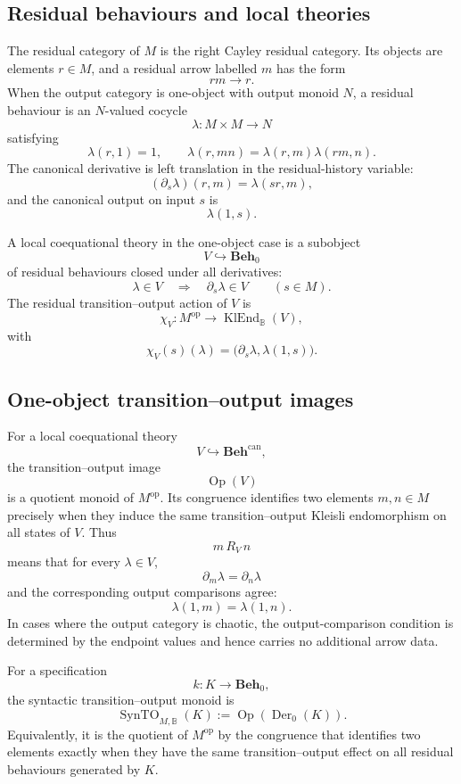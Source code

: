 \subsection{Residual behaviours and local theories}
\label{subsec:to-one-object-residual-theories}

The residual category of \(M\) is the right Cayley residual category. Its
objects are elements \(r\in M\), and a residual arrow labelled \(m\) has the
form
\[
    rm\longrightarrow r .
\]
When the output category is one-object with output monoid \(N\), a residual
behaviour is an \(N\)-valued cocycle
\[
    \lambda:M\times M\to N
\]
satisfying
\[
    \lambda(r,1)=1,
    \qquad
    \lambda(r,mn)=\lambda(r,m)\lambda(rm,n).
\]
The canonical derivative is left translation in the residual-history variable:
\[
    (\partial_s\lambda)(r,m)=\lambda(sr,m),
\]
and the canonical output on input \(s\) is
\[
    \lambda(1,s).
\]

A local coequational theory in the one-object case is a subobject
\[
    V\hookrightarrow \mathbf{Beh}_0
\]
of residual behaviours closed under all derivatives:
\[
    \lambda\in V
    \quad\Longrightarrow\quad
    \partial_s\lambda\in V
    \qquad(s\in M).
\]
The residual transition--output action of \(V\) is
\[
    \chi_V:
    M^{\mathrm{op}}\to
    \operatorname{KlEnd}_{\mathbb B}(V),
\]
with
\[
    \chi_V(s)(\lambda)
    =
    \bigl(\partial_s\lambda,\lambda(1,s)\bigr).
\]

\subsection{One-object transition--output images}
\label{subsec:to-one-object-operation-images}

For a local coequational theory
\[
    V\hookrightarrow\mathbf{Beh}^{\mathrm{can}},
\]
the transition--output image
\[
    \operatorname{Op}(V)
\]
is a quotient monoid of \(M^{\mathrm{op}}\). Its congruence identifies two
elements \(m,n\in M\) precisely when they induce the same transition--output
Kleisli endomorphism on all states of \(V\). Thus
\[
    m\,R_V\,n
\]
means that for every \(\lambda\in V\),
\[
    \partial_m\lambda=\partial_n\lambda
\]
and the corresponding output comparisons agree:
\[
    \lambda(1,m)=\lambda(1,n).
\]
In cases where the output category is chaotic, the output-comparison condition
is determined by the endpoint values and hence carries no additional arrow
data.

For a specification
\[
    k:K\to\mathbf{Beh}_0,
\]
the syntactic transition--output monoid is
\[
    \operatorname{SynTO}_{M,\mathbb B}(K)
    :=
    \operatorname{Op}(\operatorname{Der}_0(K)).
\]
Equivalently, it is the quotient of \(M^{\mathrm{op}}\) by the congruence
that identifies two elements exactly when they have the same transition--output
effect on all residual behaviours generated by \(K\).

